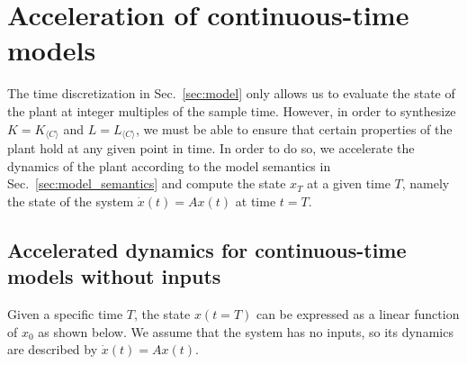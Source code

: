 \documentclass[sigconf]{llncs}
\newcommand{\mat}[1]{{#1}}
\renewcommand{\vec}[1]{{#1}}
\renewcommand{\note}[1]{\textcolor{red}{[#1]}}
\begin{document}

\section{Acceleration of continuous-time models}\label{sec:continuous_time_accel}

The time discretization in Sec.~\ref{sec:model} only allows us to evaluate
the state of the plant at integer multiples of the sample time.  However, in
order to synthesize $\mat{K}=\mat{K}_{\langle C \rangle}$ and
$\mat{L}=\mat{L}_{\langle C \rangle}$, we must be able to ensure that
certain properties of the plant hold at any given point in time.  In order
to do so, we accelerate the dynamics of the plant according to the model
semantics in Sec.~\ref{sec:model_semantics} and compute the state
$\vec{x}_T$ at a given time $T$,
%
%
namely the state of the system $\dot{\vec{x}}(t)=\mat{A}\vec{x}(t)$ at time
$t=T$.

\subsection{Accelerated\! dynamics\! for\! continuous-time\! models\! without\! inputs}\label{sec:cont_acc_no_inputs}
%
Given a specific time $T$, the state $\vec{x}(t=T)$ can be expressed as a
linear function of $\vec{x}_0$ as shown below.  We assume that the system
has no inputs, so its dynamics are described by
$\dot{\vec{x}}(t)=\mat{A}\vec{x}(t)$.
 
\end{document}
